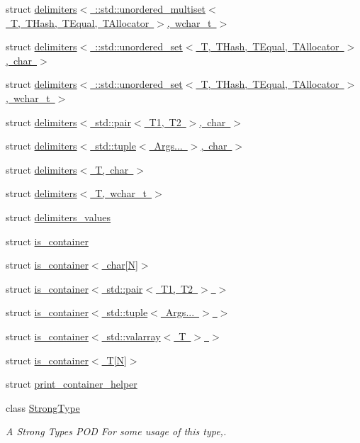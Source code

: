 \begin{DoxyCompactItemize}
\item 
struct \mbox{\hyperlink{structutils_1_1delimiters_3_01_1_1std_1_1unordered__multiset_3_01_t_00_01_t_hash_00_01_t_equal_0dd8c4434f263cab40f3b55ed479207a0}{delimiters$<$ \+::std\+::unordered\+\_\+multiset$<$ T, T\+Hash, T\+Equal, T\+Allocator $>$, wchar\+\_\+t $>$}}
\item 
struct \mbox{\hyperlink{structutils_1_1delimiters_3_01_1_1std_1_1unordered__set_3_01_t_00_01_t_hash_00_01_t_equal_00_01_t_allocator_01_4_00_01char_01_4}{delimiters$<$ \+::std\+::unordered\+\_\+set$<$ T, T\+Hash, T\+Equal, T\+Allocator $>$, char $>$}}
\item 
struct \mbox{\hyperlink{structutils_1_1delimiters_3_01_1_1std_1_1unordered__set_3_01_t_00_01_t_hash_00_01_t_equal_00_01_7664ae63421d022171aa24890067c483}{delimiters$<$ \+::std\+::unordered\+\_\+set$<$ T, T\+Hash, T\+Equal, T\+Allocator $>$, wchar\+\_\+t $>$}}
\item 
struct \mbox{\hyperlink{structutils_1_1delimiters_3_01std_1_1pair_3_01_t1_00_01_t2_01_4_00_01char_01_4}{delimiters$<$ std\+::pair$<$ T1, T2 $>$, char $>$}}
\item 
struct \mbox{\hyperlink{structutils_1_1delimiters_3_01std_1_1tuple_3_01_args_8_8_8_01_4_00_01char_01_4}{delimiters$<$ std\+::tuple$<$ Args... $>$, char $>$}}
\item 
struct \mbox{\hyperlink{structutils_1_1delimiters_3_01_t_00_01char_01_4}{delimiters$<$ T, char $>$}}
\item 
struct \mbox{\hyperlink{structutils_1_1delimiters_3_01_t_00_01wchar__t_01_4}{delimiters$<$ T, wchar\+\_\+t $>$}}
\item 
struct \mbox{\hyperlink{structutils_1_1delimiters__values}{delimiters\+\_\+values}}
\item 
struct \mbox{\hyperlink{structutils_1_1is__container}{is\+\_\+container}}
\item 
struct \mbox{\hyperlink{structutils_1_1is__container_3_01char[_n]_4}{is\+\_\+container$<$ char\mbox{[}\+N\mbox{]}$>$}}
\item 
struct \mbox{\hyperlink{structutils_1_1is__container_3_01std_1_1pair_3_01_t1_00_01_t2_01_4_01_4}{is\+\_\+container$<$ std\+::pair$<$ T1, T2 $>$ $>$}}
\item 
struct \mbox{\hyperlink{structutils_1_1is__container_3_01std_1_1tuple_3_01_args_8_8_8_01_4_01_4}{is\+\_\+container$<$ std\+::tuple$<$ Args... $>$ $>$}}
\item 
struct \mbox{\hyperlink{structutils_1_1is__container_3_01std_1_1valarray_3_01_t_01_4_01_4}{is\+\_\+container$<$ std\+::valarray$<$ T $>$ $>$}}
\item 
struct \mbox{\hyperlink{structutils_1_1is__container_3_01_t[_n]_4}{is\+\_\+container$<$ T\mbox{[}\+N\mbox{]}$>$}}
\item 
struct \mbox{\hyperlink{structutils_1_1print__container__helper}{print\+\_\+container\+\_\+helper}}
\item 
class \mbox{\hyperlink{classutils_1_1_strong_type}{Strong\+Type}}
\begin{DoxyCompactList}\small\item\em A Strong Types P\+OD For some usage of this type,. \end{DoxyCompactList}\end{DoxyCompactItemize}
